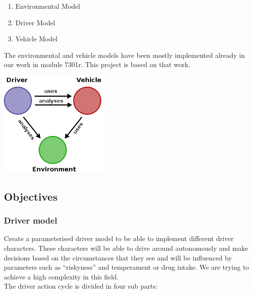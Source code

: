 \documentclass[a4paper,10pt,titlepage]{article}
\begin{document}
\begin{enumerate}
 \item Environmental Model
 \item Driver Model
 \item Vehicle Model
\end{enumerate}
The environmental and vehicle models have been mostly implemented already in our work in module 7301r. This project is based on that work.

\begin{center}
\includegraphics[width=5.5cm]{skizze.png}
\end{center}

\subsection{Objectives}
\subsubsection{Driver model}
 Create a parameterised driver model to be able to implement different 
 driver characters. These characters will be able to drive around autonomously 
 and make decisions based on the circumstances that they see and will be 
 influenced by parameters such as ``riskyness'' and temperament or drug intake.
 We are trying to achieve a high complexity in this field.\\

 The driver action cycle is divided in four sub parts:
 
\end{document}
